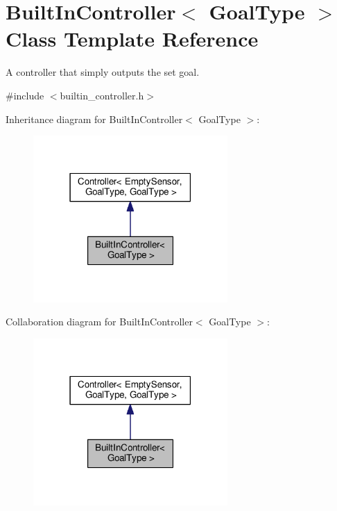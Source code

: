 \hypertarget{classBuiltInController}{\section{Built\-In\-Controller$<$ Goal\-Type $>$ Class Template Reference}
\label{classBuiltInController}
}


A controller that simply outputs the set goal.  




{\ttfamily \#include $<$builtin\-\_\-controller.\-h$>$}



Inheritance diagram for Built\-In\-Controller$<$ Goal\-Type $>$\-:\nopagebreak
\begin{figure}[H]
\begin{center}
\leavevmode
\includegraphics[width=210pt]{classBuiltInController__inherit__graph}
\end{center}
\end{figure}


Collaboration diagram for Built\-In\-Controller$<$ Goal\-Type $>$\-:\nopagebreak
\begin{figure}[H]
\begin{center}
\leavevmode
\includegraphics[width=210pt]{classBuiltInController__coll__graph}
\end{center}
\end{figure}
